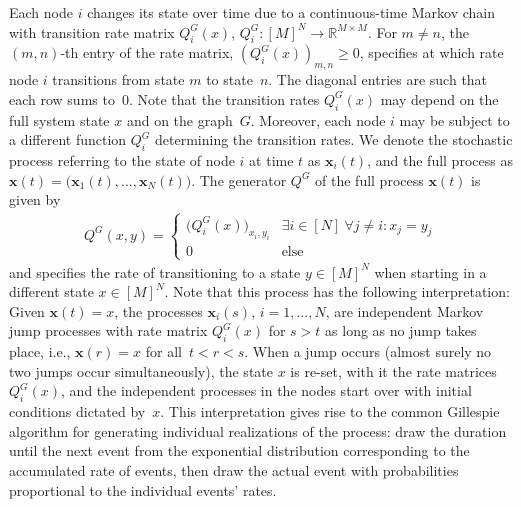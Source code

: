 \documentclass[a4paper,
               10pt,
               pdftex,
               normalheadings,
               headsepline,
               footsepline,
               headinclude,
               footinclude,
               DIV=14,
               abstracton]
{scrartcl}
\newcommand{\R}{\mathbb{R}}
\newcommand{\rv}[1]{\bm{#1}}
\begin{document}
Each node $i$ changes its state over time due to a continuous-time Markov chain with transition rate matrix
$Q_i^G(x)$, $Q_i^G:[M]^N \to \R^{M\times M}.$
For $m \neq n$, the $(m,n)$-th entry of the rate matrix, $(Q_i^G(x))_{m,n} \geq 0$, specifies at which rate node $i$ transitions from state $m$ to state~$n$. The diagonal entries are such that each row sums to~0.
Note that the transition rates $Q_i^G(x)$ may depend on the full system state $x$ and on the graph~$G$. Moreover, each node $i$ may be subject to a different function $Q_i^G$ determining the transition rates.
We denote the stochastic process referring to the state of node $i$ at time $t$ as $\rv{x}_i(t)$, and the full process as $\rv{x}(t) = \big(\rv{x}_1(t),\dots,\rv{x}_N(t)\big).$
The generator $Q^G$ of the full process $\rv{x}(t)$ is given by
\begin{align}
    Q^G(x,y) = \begin{cases}
    \big(Q_i^G(x)\big)_{x_i, y_i} & \exists i \in [N]\ \forall j \neq i: x_j = y_j\\
    0 & \text{else}
    \end{cases}
\end{align}
and specifies the rate of transitioning to a state $y \in [M]^N$ when starting in a different state $x \in [M]^N$.
Note that this process has the following interpretation: Given $\rv{x}(t) = x$, the processes $\rv{x}_i(s)$, $i=1,\dots,N$, are independent Markov jump processes with rate matrix $Q^G_i(x)$ for $s>t$ as long as no jump takes place, i.e., $\rv{x}(r) = x$ for all~$t<r<s$. When a jump occurs (almost surely no two jumps occur simultaneously), the state $x$ is re-set, with it the rate matrices $Q^G_i(x)$, and the independent processes in the nodes start over with initial conditions dictated by~$x$.
This interpretation gives rise to the common Gillespie algorithm \cite{Gillespie1977} for generating individual realizations of the process: draw the duration until the next event from the exponential distribution corresponding to the accumulated rate of events, then draw the actual event with probabilities proportional to the individual events' rates.
\end{document}
